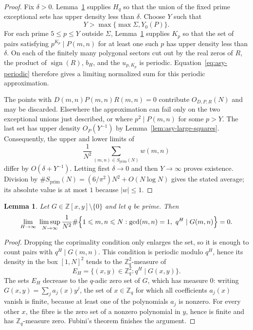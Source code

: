 \documentclass[12pt,reqno]{amsart}
\numberwithin{equation}{section}
\newtheorem{lemma}[theorem]{Lemma}
\theoremstyle{definition}
\renewcommand{\le}{\leqslant}
\newcommand{\ZZ}{\mathbb{Z}}
\DeclareMathOperator{\sign}{sign}
\begin{document}
\begin{proof}
Fix $\delta>0$.
Lemma~\ref{lem:asy-qadic} supplies $H_q$ so that the union of the fixed prime exceptional sets has upper density less than $\delta$.
Choose $Y$ such that
\[
Y>\max\{\max\Sigma,Y_0(P)\}.
\]
For each prime $5\le p\le Y$ outside $\Sigma$, Lemma~\ref{lem:asy-qadic} supplies $K_p$ so that the set of pairs satisfying $p^{K_p}\mid P(m,n)$ for at least one such $p$ has upper density less than $\delta$.
On each of the finitely many polygonal sectors cut out by the real zeros of $R$, the product of $\sign(R)$, $b_H$, and the $u_{p,K_p}$ is periodic.
Equation~\eqref{eq:asy-periodic} therefore gives a limiting normalized sum for this periodic approximation.

The points with $D(m,n)P(m,n)R(m,n)=0$ contribute $O_{D,P,R}(N)$ and may be discarded.
Elsewhere the approximation can fail only on the two exceptional unions just described, or where $p^2\mid P(m,n)$ for some $p>Y$.
The last set has upper density $O_P(Y^{-1})$ by Lemma~\ref{lem:asy-large-squares}.
Consequently, the upper and lower limits of
\[
\frac{1}{N^2}\sum_{(m,n)\in S_{\mathrm{prim}}(N)}w(m,n)
\]
differ by $O(\delta+Y^{-1})$.
Letting first $\delta\to0$ and then $Y\to\infty$ proves existence.
Division by $\#S_{\mathrm{prim}}(N)=(6/\pi^2)N^2+O(N\log N)$ gives the stated average; its absolute value is at most $1$ because $|w|\le1$.
\end{proof}

\begin{lemma}\label{lem:asy-qadic}
Let $G\in \ZZ[x,y]\setminus\{0\}$ and let $q$ be prime.
Then
\[
\lim_{H\to\infty}\ \limsup_{N\to\infty}\frac{1}{N^2}
\#\Bigl\{1\le m,n\le N:\gcd(m,n)=1,\ q^H\mid G(m,n)\Bigr\}=0.
\]
\end{lemma}

\begin{proof}
Dropping the coprimality condition only enlarges the set, so it is enough to count pairs with $q^H\mid G(m,n)$.
This condition is periodic modulo $q^H$, hence its density in the box $[1,N]^2$ tends to the $\ZZ_q^2$-measure of
\[
E_H=\{(x,y)\in \ZZ_q^2:q^H\mid G(x,y)\}.
\]
The sets $E_H$ decrease to the $q$-adic zero set of $G$, which has measure $0$: writing $G(x,y)=\sum_j a_j(x)y^j$, the set of $x\in\ZZ_q$ for which all coefficients $a_j(x)$ vanish is finite, because at least one of the polynomials $a_j$ is nonzero.
For every other $x$, the fibre is the zero set of a nonzero polynomial in $y$, hence is finite and has $\ZZ_q$-measure zero.
Fubini's theorem finishes the argument.
\end{proof}
\end{document}
